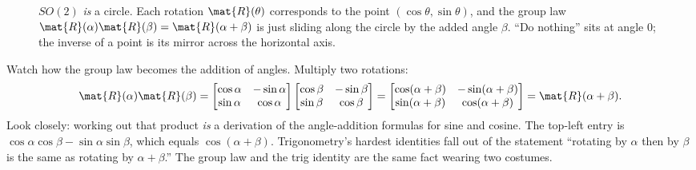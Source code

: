 \begin{figure}[H]
\centering
{}
\caption{$SO(2)$ \emph{is} a circle. Each rotation $\mat{R}(\theta)$ corresponds to
the point $(\cos\theta,\sin\theta)$, and the group law
$\mat{R}(\alpha)\mat{R}(\beta)=\mat{R}(\alpha+\beta)$ is just sliding along the
circle by the added angle $\beta$. ``Do nothing'' sits at angle $0$; the inverse of
a point is its mirror across the horizontal axis.}
\label{ch37:fig-so2circle}
\end{figure}

Watch how the group law becomes the addition of angles. Multiply two rotations:
\[
  \mat{R}(\alpha)\mat{R}(\beta)
  = \begin{bmatrix}\cos\alpha & -\sin\alpha\\ \sin\alpha & \cos\alpha\end{bmatrix}
    \begin{bmatrix}\cos\beta & -\sin\beta\\ \sin\beta & \cos\beta\end{bmatrix}
  = \begin{bmatrix}\cos(\alpha+\beta) & -\sin(\alpha+\beta)\\ \sin(\alpha+\beta) & \cos(\alpha+\beta)\end{bmatrix}
  = \mat{R}(\alpha+\beta).
\]
Look closely: working out that product \emph{is} a derivation of the angle-addition
formulas for sine and cosine. The top-left entry is $\cos\alpha\cos\beta -
\sin\alpha\sin\beta$, which equals $\cos(\alpha+\beta)$. Trigonometry's hardest
identities fall out of the statement ``rotating by $\alpha$ then by $\beta$ is the
same as rotating by $\alpha+\beta$.'' The group law and the trig identity are the
same fact wearing two costumes.

